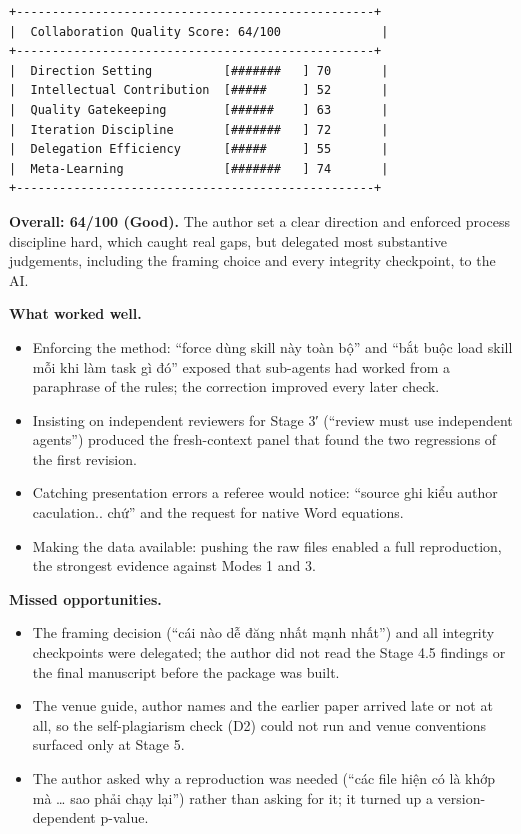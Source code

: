 \documentclass[12pt,a4paper]{article}
\providecommand{\tightlist}{\setlength{\itemsep}{0pt}\setlength{\parskip}{0pt}}
\begin{document}
\begin{verbatim}
+--------------------------------------------------+
|  Collaboration Quality Score: 64/100              |
+--------------------------------------------------+
|  Direction Setting          [#######   ] 70       |
|  Intellectual Contribution  [#####     ] 52       |
|  Quality Gatekeeping        [######    ] 63       |
|  Iteration Discipline       [#######   ] 72       |
|  Delegation Efficiency      [#####     ] 55       |
|  Meta-Learning              [#######   ] 74       |
+--------------------------------------------------+
\end{verbatim}

\textbf{Overall: 64/100 (Good).} The author set a clear direction and
enforced process discipline hard, which caught real gaps, but delegated
most substantive judgements, including the framing choice and every
integrity checkpoint, to the AI.

\textbf{What worked well.}

\begin{itemize}
\tightlist
\item
  Enforcing the method: ``force dùng skill này toàn bộ'' and ``bắt buộc
  load skill mỗi khi làm task gì đó'' exposed that sub-agents had worked
  from a paraphrase of the rules; the correction improved every later
  check.
\item
  Insisting on independent reviewers for Stage 3′ (``review must use
  independent agents'') produced the fresh-context panel that found the
  two regressions of the first revision.
\item
  Catching presentation errors a referee would notice: ``source ghi kiểu
  author caculation.. chứ'' and the request for native Word equations.
\item
  Making the data available: pushing the raw files enabled a full
  reproduction, the strongest evidence against Modes 1 and 3.
\end{itemize}

\textbf{Missed opportunities.}

\begin{itemize}
\tightlist
\item
  The framing decision (``cái nào dễ đăng nhất mạnh nhất'') and all
  integrity checkpoints were delegated; the author did not read the
  Stage 4.5 findings or the final manuscript before the package was
  built.
\item
  The venue guide, author names and the earlier paper arrived late or
  not at all, so the self-plagiarism check (D2) could not run and venue
  conventions surfaced only at Stage 5.
\item
  The author asked why a reproduction was needed (``các file hiện có là
  khớp mà \ldots{} sao phải chạy lại'') rather than asking for it; it
  turned up a version-dependent p-value.
\end{itemize}
\end{document}
